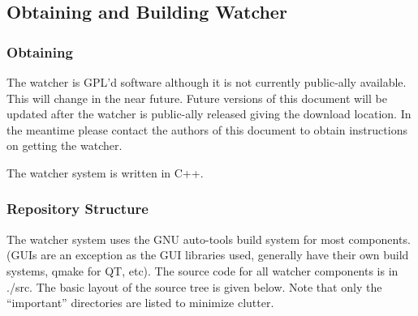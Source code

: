 \documentclass{article}
\begin{document}
\subsection{Obtaining and Building Watcher}
\subsubsection{Obtaining}
The watcher is GPL'd software although it is not currently public-ally available. This will change in the near future. Future versions of this 
document will be updated after the watcher is public-ally released giving the download location. In the meantime please contact the authors 
of this document to obtain instructions on getting the watcher. 

The watcher system is written in C++. 

\subsubsection{Repository Structure}
The watcher system uses the GNU auto-tools build system for most components. (GUIs are an exception as the GUI libraries used, generally have 
their own build systems, qmake for QT, etc).  The source code for all watcher components is in .\slash src. The basic layout of the source tree is given
below. Note that only the ``important'' directories are listed to minimize clutter. 
\end{document}

